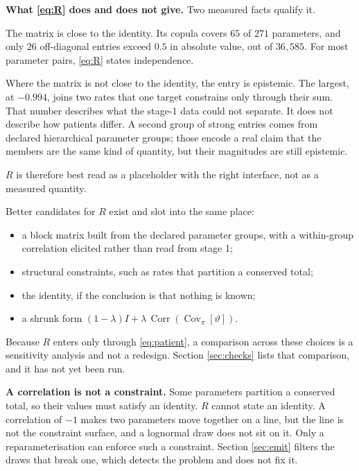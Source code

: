 \documentclass[11pt]{article}
\DeclareMathOperator{\Cov}{Cov}
\DeclareMathOperator{\Corr}{Corr}
\begin{document}
\begin{assumpbox}
\textbf{What \eqref{eq:R} does and does not give.} Two measured facts qualify it.

The matrix is close to the identity. Its copula covers $65$ of $271$
parameters, and only $26$ off-diagonal entries exceed $0.5$ in absolute value,
out of $36{,}585$. For most parameter pairs, \eqref{eq:R} states independence.

Where the matrix is not close to the identity, the entry is epistemic. The
largest, at $-0.994$, joins two rates that one target constrains only through
their sum. That number describes what the stage-1 data could not separate. It
does not describe how patients differ. A second group of strong entries comes
from declared hierarchical parameter groups; those encode a real claim that the
members are the same kind of quantity, but their magnitudes are still epistemic.

$R$ is therefore best read as a placeholder with the right interface, not as a
measured quantity.
\end{assumpbox}

Better candidates for $R$ exist and slot into the same place:
\begin{itemize}
\item a block matrix built from the declared parameter groups, with a within-group
      correlation elicited rather than read from stage 1;
\item structural constraints, such as rates that partition a conserved total;
\item the identity, if the conclusion is that nothing is known;
\item a shrunk form $(1-\lambda)I + \lambda\,\Corr(\Cov_\pi[\vartheta])$.
\end{itemize}
Because $R$ enters only through \eqref{eq:patient}, a comparison across these
choices is a sensitivity analysis and not a redesign. Section \ref{sec:checks}
lists that comparison, and it has not yet been run.

\begin{notebox}
\textbf{A correlation is not a constraint.} Some parameters partition a conserved
total, so their values must satisfy an identity. $R$ cannot state an identity. A
correlation of $-1$ makes two parameters move together on a line, but the line is
not the constraint surface, and a lognormal draw does not sit on it. Only a
reparameterisation can enforce such a constraint. Section \ref{sec:emit} filters
the draws that break one, which detects the problem and does not fix it.
\end{notebox}
\end{document}
